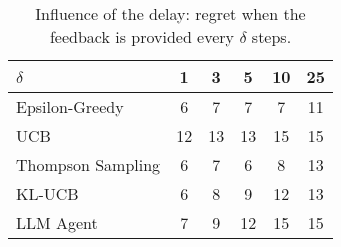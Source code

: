 \begin{table}[h!]
\centering
\begin{tabular}{lccccc}
\toprule
$\delta$ & 1 & 3 & 5 & 10 & 25 \\ \midrule
Epsilon-Greedy & 6 & 7 & 7 & 7 & 11 \\
UCB & 12 & 13 & 13 & 15 & 15 \\
Thompson Sampling & 6 & 7 & 6 & 8 & 13 \\
KL-UCB & 6 & 8 & 9 & 12 & 13 \\
LLM Agent & 7 & 9 & 12 & 15 & 15 \\
\bottomrule
\end{tabular}
\caption{Influence of the delay: regret when the feedback is provided every $\delta$ steps.}
\end{table}
